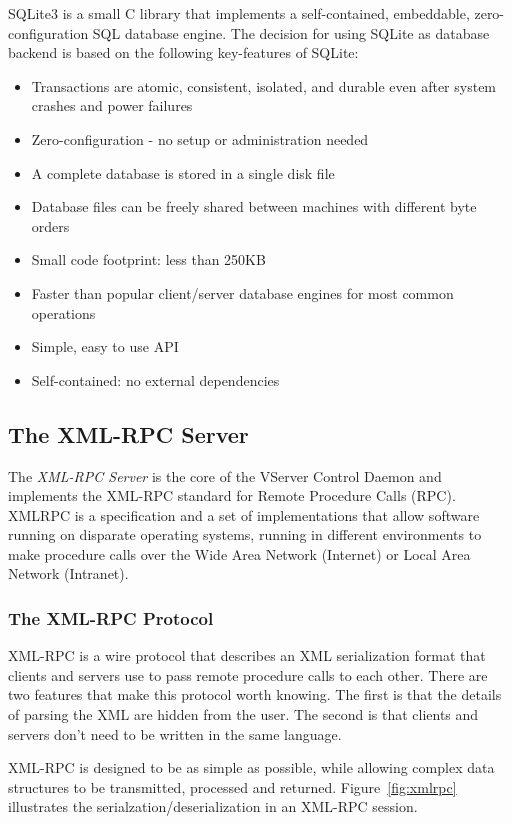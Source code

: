 SQLite3 is a small C library that implements a self-contained, embeddable,
zero-configuration SQL database engine. The decision for using SQLite as
database backend is based on the following key-features of SQLite:

\begin{itemize}
	\item Transactions are atomic, consistent, isolated, and durable even
		after system crashes and power failures
	\item Zero-configuration - no setup or administration needed
	\item A complete database is stored in a single disk file
	\item Database files can be freely shared between machines with different
		byte orders
	\item Small code footprint: less than 250KB
	\item Faster than popular client/server database engines for most common
		operations
	\item Simple, easy to use API
	\item Self-contained: no external dependencies
\end{itemize}

\subsection{The XML-RPC Server}

The \emph{XML-RPC Server} is the core of the VServer Control Daemon and
implements the XML-RPC standard for Remote Procedure Calls (RPC). XMLRPC is a
specification and a set of implementations that allow software running on
disparate operating systems, running in different environments to make
procedure calls over the Wide Area Network (Internet) or Local Area Network
(Intranet).


\subsubsection{The XML-RPC Protocol}

XML-RPC is a wire protocol that describes an XML serialization format that
clients and servers use to pass remote procedure calls to each other. There are
two features that make this protocol worth knowing. The first is that the
details of parsing the XML are hidden from the user. The second is that clients
and servers don't need to be written in the same language.

XML-RPC is designed to be as simple as possible, while allowing complex data
structures to be transmitted, processed and returned. Figure~\ref{fig:xmlrpc}
illustrates the serialzation/deserialization in an XML-RPC session.

